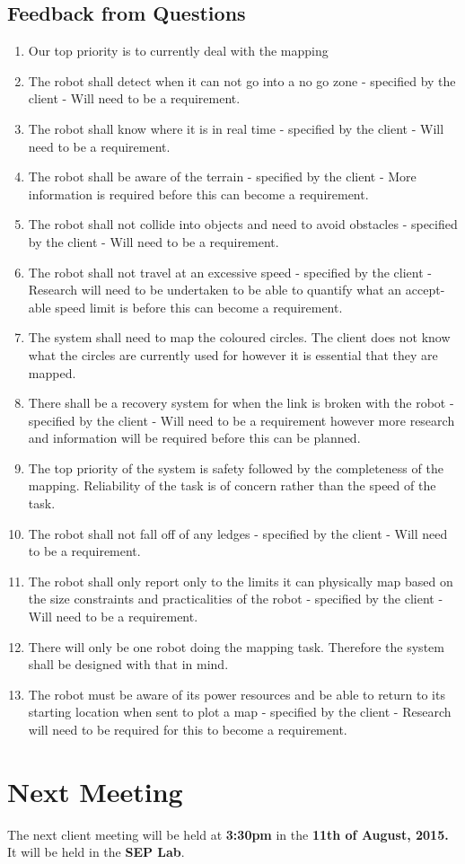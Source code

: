 \documentclass[a4paper]{article}
\begin{document}
\subsection{Feedback from Questions}
\begin{enumerate}
\item Our top priority is to currently deal with the mapping
\item The robot shall detect when it can not go into a no go zone - specified by the client - Will need to be a requirement.
\item The robot shall know where it is in real time - specified by the client - Will need to be a requirement.
\item The robot shall be aware of the terrain - specified by the client - More information is required before this can become a requirement.
\item The robot shall not collide into objects and need to avoid obstacles - specified by the client - Will need to be a requirement.
\item The robot shall not travel at an excessive speed - specified by the client - Research will need to be undertaken to be able to quantify what an accept- able speed limit is before this can become a requirement.
\item The system shall need to map the coloured circles. The client does not know what the circles are currently used for however it is essential that they are mapped.
\item There shall be a recovery system for when the link is broken with the robot - specified by the client - Will need to be a requirement however more research and information will be required before this can be planned.
\item The top priority of the system is safety followed by the completeness of the mapping. Reliability of the task is of concern rather than the speed of the task.
\item The robot shall not fall off of any ledges - specified by the client - Will need to be a requirement.
\item The robot shall only report only to the limits it can physically map based on the size constraints and practicalities of the robot - specified by the client - Will need to be a requirement.
\item There will only be one robot doing the mapping task. Therefore the system shall be designed with that in mind.
\item The robot must be aware of its power resources and be able to return to its starting location when sent to plot a map - specified by the client - Research will need to be required for this to become a requirement.
   \end{enumerate}

\section{Next Meeting}
The next client meeting will be held at \textbf{3:30pm} in the \textbf{11th of August, 2015.} It will be held in the \textbf{SEP Lab}.
\end{document}
